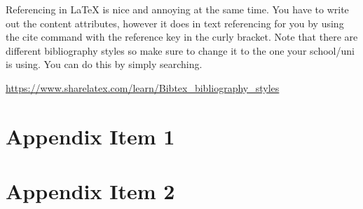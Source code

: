 \documentclass[11pt,a4paper,titlepage]{article}
\begin{document}
Referencing in \LaTeX{} is nice and annoying at the same time. You have to write out the content attributes, however it does in text referencing for you by using  the cite command with the reference key in the curly bracket. Note that there are different bibliography styles so make sure to change it to the one your school/uni is using. You can do this by simply searching.

\url{https://www.sharelatex.com/learn/Bibtex_bibliography_styles}





\clearpage
\appendix


\section{Appendix Item 1}
\label{appendix:Appendix1}

\section{Appendix Item 2}
\label{appendix:Appendix2}
\end{document}
